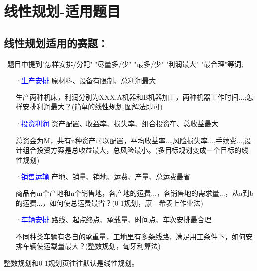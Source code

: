 \documentclass[a4paper,20pt]{article}
\begin{document}
\section{线性规划-适用题目}

\subsection{线性规划适用的赛题：} 
~题目中提到"怎样安排/分配" "尽量多/少" "最多/少" "利润最大" "最合理"等词;
\begin{itemize}
    \item[·\textcolor{blue}{生产安排}] 原材料、设备有限制、总利润最大 \par 生产两种机床，利润分别为XXX,A机器和B机器加工，两种机器工作时间...;怎样安排利润最大？(简单的线性规划,图解法即可)
    \item[·\textcolor{blue}{投资利润}] 资产配置、收益率、损失率、组合投资在、总收益最大 \par 总资金为M，共有n种资产可以配置，平均收益率...,风险损失率...,手续费...,设计组合投资方案是总收益最大，总风险最小。(多目标规划变成一个目标的线
    性规划)
    \item[·\textcolor{blue}{销售运输}] 产地、销量、销地、运费、产量、总运费最省\par 商品有m个产地和n个销售地，各产地的运费...，各销售地的需求量...，从a到b的运费...，如何使总运费最省？(0-1规划，康—希表上作业法)
    \item[·\textcolor{blue}{车辆安排}] 路线、起点终点、承载量、时间点、车次安排最合理\par 不同种类车辆有各自的承重量，工地里有多条线路，满足用工条件下，如何安排车辆使运载量最大？(整数规划，匈牙利算法)          
\end{itemize}
整数规划和0-1规划页往往默认是线性规划。
\end{document}
